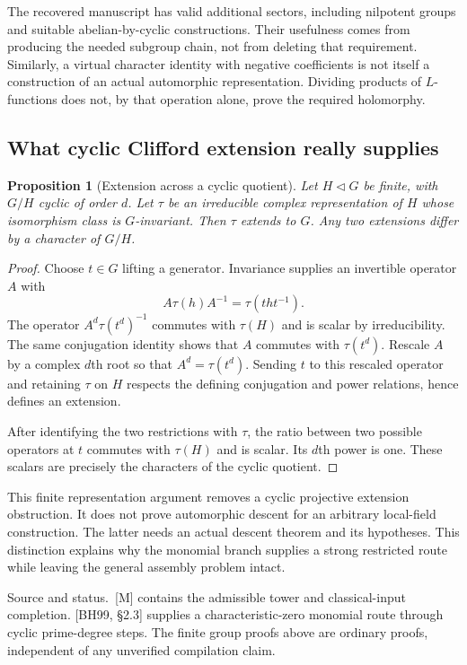 \documentclass[11pt]{article}
\newtheorem{proposition}{Proposition}[section]
\theoremstyle{definition}\newtheorem{definition}[proposition]{Definition}
\newcommand{\source}[1]{\par{\small\textsf{Source and status.}\ #1}\par}
\begin{document}
The recovered manuscript has valid additional sectors, including nilpotent groups and suitable abelian-by-cyclic constructions. Their usefulness comes from producing the needed subgroup chain, not from deleting that requirement. Similarly, a virtual character identity with negative coefficients is not itself a construction of an actual automorphic representation. Dividing products of $L$-functions does not, by that operation alone, prove the required holomorphy.

\subsection{What cyclic Clifford extension really supplies}
\begin{proposition}[Extension across a cyclic quotient]\label{prop:cyclic}
Let $H\triangleleft G$ be finite, with $G/H$ cyclic of order $d$. Let $\tau$ be an irreducible complex representation of $H$ whose isomorphism class is $G$-invariant. Then $\tau$ extends to $G$. Any two extensions differ by a character of $G/H$.
\end{proposition}
\begin{proof}
Choose $t\in G$ lifting a generator. Invariance supplies an invertible operator $A$ with
\[
 A\tau(h)A^{-1}=\tau(tht^{-1}).
\]
The operator $A^d\tau(t^d)^{-1}$ commutes with $\tau(H)$ and is scalar by irreducibility. The same conjugation identity shows that $A$ commutes with $\tau(t^d)$. Rescale $A$ by a complex $d$th root so that $A^d=\tau(t^d)$. Sending $t$ to this rescaled operator and retaining $\tau$ on $H$ respects the defining conjugation and power relations, hence defines an extension.

After identifying the two restrictions with $\tau$, the ratio between two possible operators at $t$ commutes with $\tau(H)$ and is scalar. Its $d$th power is one. These scalars are precisely the characters of the cyclic quotient.
\end{proof}

This finite representation argument removes a cyclic projective extension obstruction. It does not prove automorphic descent for an arbitrary local-field construction. The latter needs an actual descent theorem and its hypotheses. This distinction explains why the monomial branch supplies a strong restricted route while leaving the general assembly problem intact.

\source{[M] contains the admissible tower and classical-input completion. [BH99, \S2.3] supplies a characteristic-zero monomial route through cyclic prime-degree steps. The finite group proofs above are ordinary proofs, independent of any unverified compilation claim.}
\end{document}
